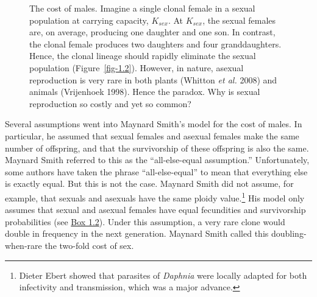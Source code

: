 \documentclass[
  letterpaper,
]{book}
\begin{document}
\begin{figure}


\caption[The cost of males]{\label{fig-1.1}The cost of males. Imagine a
single clonal female in a sexual population at carrying capacity,
\(K_{sex}\). At \(K_{sex}\), the sexual females are, on average,
producing one daughter and one son. In contrast, the clonal female
produces two daughters and four granddaughters. Hence, the clonal
lineage should rapidly eliminate the sexual population
(Figure~\ref{fig-1.2}). However, in nature, asexual reproduction is very
rare in both plants (Whitton \emph{et al.} 2008) and animals (Vrijenhoek
1998). Hence the paradox. Why is sexual reproduction so costly and yet
so common?}

\end{figure}%

Several assumptions went into Maynard Smith's model for the cost of
males. In particular, he assumed that sexual females and asexual females
make the same number of offspring, and that the survivorship of these
offspring is also the same. Maynard Smith referred to this as the
``all-else-equal assumption.'' Unfortunately, some authors have taken
the phrase ``all-else-equal'' to mean that everything else is exactly
equal. But this is not the case. Maynard Smith did not assume, for
example, that sexuals and asexuals have the same ploidy
value.\footnote{Dieter Ebert showed that parasites of \emph{Daphnia}
  were locally adapted for both infectivity and transmission, which was
  a major advance.} His model only assumes that sexual and asexual
females have equal fecundities and survivorship probabilities (see
\hyperref[callout-2]{Box 1.2}). Under this assumption, a very rare clone
would double in frequency in the next generation. Maynard Smith called
this doubling-when-rare the two-fold cost of sex.
\end{document}
